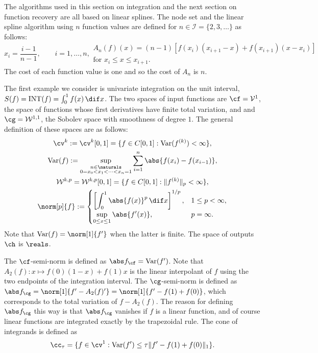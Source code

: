 The algorithms used in this section on integration and the next section on function recovery are all based on linear splines.  The node set and the linear spline algorithm using $n$ function values are defined for $n \in \mathcal{I}=\{2,3,\ldots\}$ as follows:
\begin{subequations} \label{linearspline}
\begin{equation}
x_i=\frac{i-1}{n-1}, \qquad i=1, \ldots, n,
\end{equation}
\begin{multline}
A_{n}(f)(x)=(n-1) \left[ f(x_{i})(x_{i+1}-x) +f(x_{i+1})(x-x_i) \right] \\ \text{for }x_i \leq x \leq x_{i+1}.
\end{multline}
\end{subequations}
The cost of each function value is one and so the cost of  $A_n$ is $n$.

The first example we consider is univariate integration on the unit interval, $S(f)=\INT(f)=\int_{0}^{1}f(x) \, \dif x$.  The two spaces of input functions are $\cf=\mathcal{V}^{1}$, the space of functions whose first derivatives have finite total variation, and and $\cg=\mathcal{W}^{1,1}$, the Sobolev space with smoothness of degree $1$.  The general definition of these spaces are as follows:
\begin{subequations} \label{defSobolev}
\begin{gather} 
  \cv^{k}: =\cv^{k}[0,1]=\{f\in C[0,1]: \Var(f^{(k)}) < \infty \}, \\
  \Var(f) := \sup_{\substack{n \in \naturals\\ 0 = x_0 < x_1 < \cdots < x_{n} =1}} \sum_{i=1}^n \abs{f(x_i)-f(x_{i-1})}, \\
  \mathcal{W}^{k,p}=\mathcal{W}^{k,p}[0,1]=\{f\in C[0,1]: \|f^{(k)}\|_{p}<\infty\}, \\
\norm[p]{f}:= \begin{cases} \displaystyle \left[\int_0^1 \abs{f(x)}^p \, \dif x \right]^{1/p}, & 1 \le p < \infty,\\[1ex]
\displaystyle  \sup_{0 \le x \le 1} \abs{f'(x)}, & p=\infty.
\end{cases}
\end{gather}
\end{subequations}
Note that $\Var(f)=\norm[1]{f'}$ when the latter is finite.  The space of outputs $\ch$ is $\reals$.

The $\cf$-semi-norm is defined as $\Fnorm{f}=\Var(f')$.  Note that $A_2(f): x \mapsto f(0)(1-x)+f(1)x$ is the linear interpolant of $f$ using the two endpoints of the integration interval.  The $\cg$-semi-norm is defined as $\Gnorm{f}=\norm[1]{f'-A_2(f)'}=\norm[1]{f'-f(1)+f(0)}$, which corresponds to the total variation of $f-A_2(f)$.  The reason for defining $\Gnorm{f}$ this way is that $\Gnorm{f}$ vanishes if $f$ is a linear function, and of course linear functions are integrated exactly by the trapezoidal rule.  The cone of integrands is defined as  
\begin{equation}\label{coneinteg}
\cc_{\tau}=\{f\in \cv^{1}:\Var(f')\leq\tau\|f'-f(1)+f(0)\|_1\}.
\end{equation}

